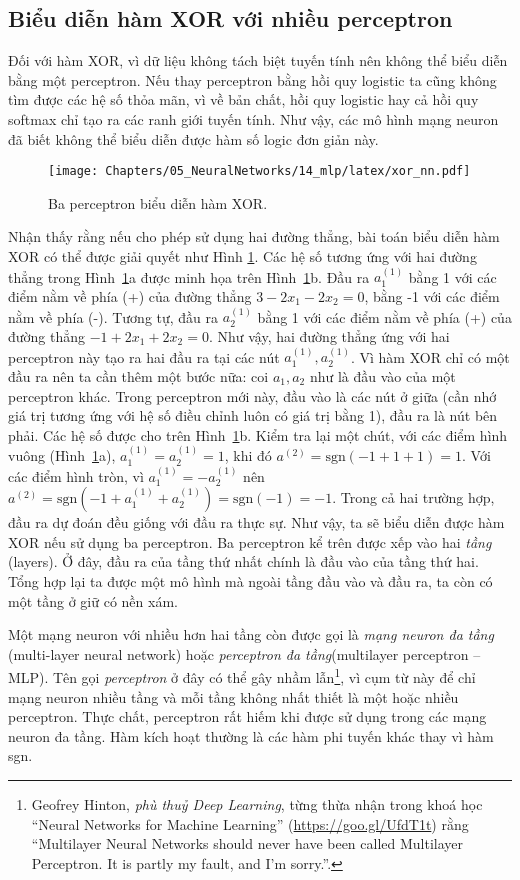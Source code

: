 \subsection{Biểu diễn hàm XOR với nhiều perceptron}
Đối với hàm XOR, vì dữ liệu không tách biệt tuyến tính nên không thể biểu diễn
bằng một perceptron. Nếu thay perceptron bằng hồi quy logistic ta cũng không tìm
được các hệ số thỏa mãn, vì về bản chất, hồi quy logistic hay cả hồi quy softmax
chỉ tạo ra các ranh giới tuyến tính. Như vậy, các mô hình mạng neuron đã biết
không thể biểu diễn được hàm số logic đơn giản này.



\begin{figure}[t]
\centering
\texttt{[image: Chapters/05\_NeuralNetworks/14\_mlp/latex/xor\_nn.pdf]}
\caption[]{Ba perceptron biểu diễn hàm XOR.}
\label{fig:14_2}
\end{figure}

Nhận thấy rằng nếu cho phép sử dụng hai đường thẳng, bài toán biểu diễn hàm XOR
có thể được giải quyết như Hình \ref{fig:14_2}. Các hệ số tương ứng với hai
đường thẳng trong Hình~\ref{fig:14_2}a được minh họa trên Hình~\ref{fig:14_2}b. Đầu ra $a_1^{(1)}$ bằng 1
với các điểm nằm về phía (+) của đường thẳng $3 -2x_1 -2x_2 = 0$, bằng -1 với
các điểm nằm về phía (-). Tương tự, đầu ra $a_2^{(1)}$ bằng 1 với các điểm nằm về phía
(+) của đường thẳng $-1 +2x_1 + 2x_2 = 0$. Như vậy, hai đường thẳng ứng với hai
perceptron này tạo ra hai đầu ra tại các nút $a_1^{(1)}, a_2^{(1)}$. Vì hàm XOR
chỉ có một đầu ra nên ta cần thêm một bước nữa: coi $a_1, a_2$ như là đầu
vào của một perceptron khác. Trong perceptron mới này, đầu vào là các nút ở giữa
(cần nhớ giá trị tương ứng với hệ số điều chỉnh luôn có giá trị bằng 1), đầu ra là nút bên phải. Các hệ số
được cho trên Hình~\ref{fig:14_2}b. Kiểm tra lại một chút, với các điểm hình
vuông (Hình~\ref{fig:14_2}a), $a^{(1)}_1 = a^{(1)}_2 = 1$, khi đó $a^{(2)}
= \text{sgn}(-1 +1 + 1) = 1$. Với các điểm hình tròn, vì $a^{(1)}_1 =
-a^{(1)}_2$ nên $a^{(2)} = \text{sgn}(-1 + a^{(1)}_1 + a^{(1)}_2) =
\text{sgn}(-1) = -1$. Trong cả hai trường hợp, đầu ra dự đoán đều giống với đầu
ra thực sự. Như vậy, ta sẽ biểu diễn được hàm XOR nếu sử dụng ba perceptron. Ba perceptron kể trên được
xếp vào hai \textit{tầng} ({layers}). Ở đây, đầu ra của tầng thứ nhất chính là
đầu vào của tầng thứ hai. Tổng hợp lại ta được một mô hình mà ngoài tầng đầu
vào và đầu ra, ta còn có một tầng ở giữ có nền xám.

Một mạng neuron với nhiều hơn hai tầng còn được gọi là \textit{mạng neuron đa tầng} (multi-layer neural network) hoặc \textit{perceptron đa tầng}(multilayer perceptron -- MLP). Tên gọi
\textit{perceptron} ở đây có thể gây nhầm lẫn\footnote{Geofrey Hinton,
\textit{phù thuỷ Deep Learning}, từng thừa nhận trong khoá học ``Neural Networks
for Machine Learning'' (\url{https://goo.gl/UfdT1t}) rằng ``Multilayer Neural
Networks should never have been called Multilayer Perceptron. It is partly my
fault, and I'm sorry.''.}, vì cụm từ này để chỉ mạng neuron nhiều tầng
và mỗi tầng không nhất thiết là một hoặc
nhiều perceptron. Thực chất, perceptron rất hiếm khi được sử dụng trong các mạng neuron đa tầng. Hàm kích hoạt thường là các hàm phi tuyến khác thay vì hàm
sgn.


